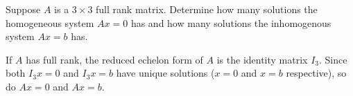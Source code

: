\documentclass{ximera}
\begin{document}
\begin{exercise} \label{YZ_3.4.1}

Suppose $A$ is a $3\times 3$ full rank matrix. Determine how many solutions the homogeneous system $Ax=0$ has and how many solutions the inhomogenous system $Ax=b$ has.


\begin{solution}
\ans
If $A$ has full rank, the reduced echelon form of $A$ is the identity matrix $I_3$. Since both $I_3x=0$ and $I_3x=b$ have unique solutions ($x=0$ and $x=b$ respective), so do $Ax=0$ and $Ax=b$.

\end{solution}
\end{exercise}
\end{document}
